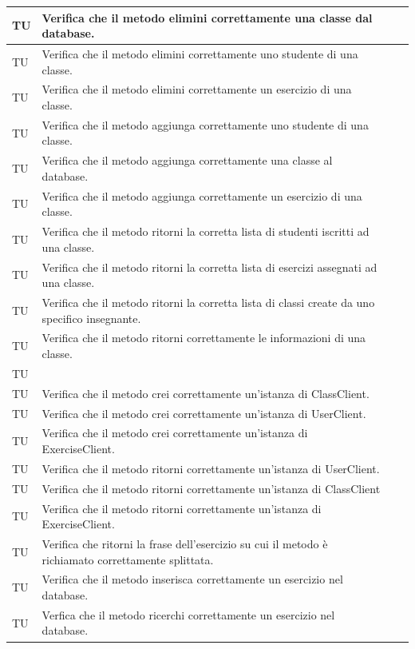 \begin{longtable}{|>{\centering\arraybackslash}m{1.6cm}|>{\centering\arraybackslash}m{6.41cm}|>{\centering\arraybackslash}m{3.1cm}| c |}
		TU & Verifica che il metodo elimini correttamente una classe dal database.  \\ \hline
		TU & Verifica che il metodo elimini correttamente uno studente di una classe.  \\ \hline
		TU & Verifica che il metodo elimini correttamente un esercizio di una classe.  \\ \hline
		TU & Verifica che il metodo aggiunga correttamente uno studente di una classe.  \\ \hline
		TU & Verifica che il metodo aggiunga correttamente una classe al database. \\ \hline
		TU & Verifica che il metodo aggiunga correttamente un esercizio di una classe.  \\ \hline
		TU & Verifica che il metodo ritorni la corretta lista di studenti iscritti ad una classe.  \\ \hline
		TU & Verifica che il metodo ritorni la corretta lista di esercizi assegnati ad una classe.  \\ \hline
		TU & Verifica che il metodo ritorni la corretta lista di classi create da uno specifico insegnante.  \\ \hline
		TU & Verifica che il metodo ritorni correttamente le informazioni di una classe.  \\ \hline
		TU &   \\ \hline
		TU & Verifica che il metodo crei correttamente un'istanza di ClassClient.  \\ \hline
		TU & Verifica che il metodo crei correttamente un'istanza di UserClient.  \\ \hline
		TU & Verifica che il metodo crei correttamente un'istanza di ExerciseClient.  \\ \hline
		TU & Verifica che il metodo ritorni correttamente un'istanza di UserClient.  \\ \hline
		TU & Verifica che il metodo ritorni correttamente un'istanza di ClassClient  \\ \hline
		TU & Verifica che il metodo ritorni correttamente un'istanza di ExerciseClient.  \\ \hline
		TU & Verifica che ritorni la frase dell'esercizio su cui il metodo è richiamato correttamente splittata.  \\ \hline
		TU & Verifica che il metodo inserisca correttamente un esercizio nel database.  \\ \hline
		TU & Verfica che il metodo ricerchi correttamente un esercizio nel database.  \\ \hline

\end{longtable}
